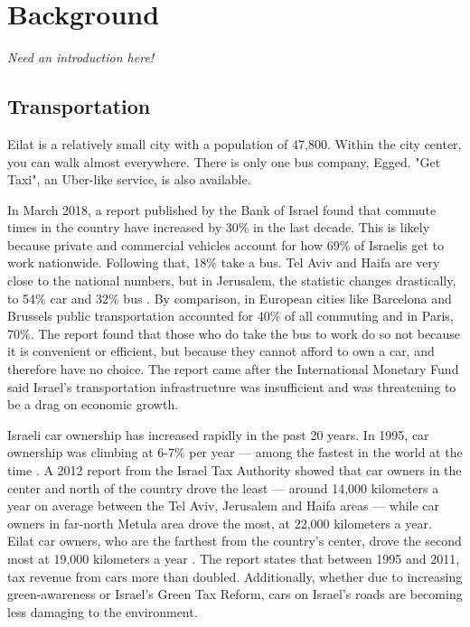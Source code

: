 \documentclass{report}                         %
\begin{document}
\newpage
\chapter{Background}
\textit{Need an introduction here!}

\section{Transportation}
Eilat is a relatively small city with a population of 47,800. Within the city center, you can walk almost everywhere. There is only one bus company, Egged. \cite{TransportationEilat} "Get Taxi", an Uber-like service, is also available. 

In March 2018, a report published by the Bank of Israel found that commute times in the country have increased by 30\% in the last decade. This is likely because private and commercial vehicles account for how 69\% of Israelis get to work nationwide. Following that, 18\% take a bus. Tel Aviv and Haifa are very close to the national numbers, but in Jerusalem, the statistic changes drastically, to 54\% car and 32\% bus \cite{Dori2018IsraeliRoads}. By comparison, in European cities like Barcelona and Brussels public transportation accounted for 40\% of all commuting and in Paris, 70\%. The report found that those who do take the bus to work do so not because it is convenient or efficient, but because they cannot afford to own a car, and therefore have no choice. The report came after the International Monetary Fund said Israel’s transportation infrastructure was insufficient and was threatening to be a drag on economic growth. 

Israeli car ownership has increased rapidly in the past 20 years. In 1995, car ownership was climbing at 6-7\% per year --- among the fastest in the world at the time \cite{Slater1995IsraelCulture}. A 2012 report from the Israel Tax Authority showed that car owners in the center and north of the country drove the least --- around 14,000 kilometers a year on average between the Tel Aviv, Jerusalem and Haifa areas --- while car owners in far-north Metula area drove the most, at 22,000 kilometers a year. Eilat car owners, who are the farthest from the country’s center, drove the second most at 19,000 kilometers a year \cite{Schmil2012WhatHow}. The report states that between 1995 and 2011, tax revenue from cars more than doubled. Additionally, whether due to increasing green-awareness or Israel’s Green Tax Reform, cars on Israel's roads are becoming less damaging to the environment\cite{Schmil2012WhatHow}.
\end{document}
